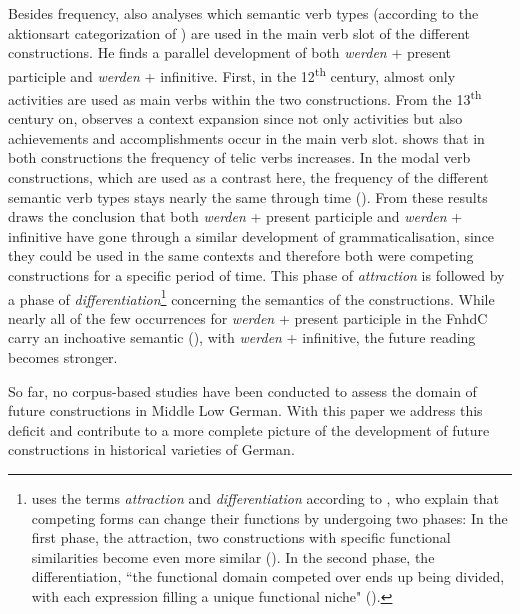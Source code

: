 \documentclass[output=paper,colorlinks,citecolor=brown]{langscibook}
\begin{document}
Besides frequency, \citet{Hartmann2021} also analyses which semantic verb types (according to the aktionsart categorization of \cite{Vendler1957}) are used in the main verb slot of the different constructions. He finds a parallel development of both \textit{werden} + present participle and \textit{werden} + infinitive. First, in the 12\textsuperscript{th} century, almost only activities are used as main verbs within the two constructions. From the 13\textsuperscript{th} century on, \citet[378--379]{Hartmann2021} observes a context expansion since not only activities but also achievements and accomplishments occur in the main verb slot. \citet[379]{Hartmann2021} shows that in both constructions the frequency of telic verbs increases. In the modal verb constructions, which are used as a contrast here, the frequency of the different semantic verb types stays nearly the same through time (\cite[380--381]{Hartmann2021}). From these results \citet[382--383]{Hartmann2021} draws the conclusion that both \textit{werden} + present participle and \textit{werden} + infinitive have gone through a similar development of grammaticalisation, since they could be used in the same contexts and therefore both were competing constructions for a specific period of time. This phase of \textit{attraction} is followed by a phase of \textit{differentiation}\footnote{\citet[389--390]{Hartmann2021} uses the terms \textit{attraction} and \textit{differentiation} according to \citet{DeSmet2018}, who explain that competing forms can change their functions by undergoing two phases: In the first phase, the attraction, two constructions with specific functional similarities become even more similar (\cite[203--204]{DeSmet2018}). In the second phase, the differentiation, ``the functional domain competed over ends up being divided, with each expression filling a unique functional niche" (\cite[198]{DeSmet2018}).} concerning the semantics of the constructions. While nearly all of the few occurrences for \textit{werden} + present participle in the FnhdC carry an inchoative semantic (\cite[390]{Hartmann2021}), with \textit{werden} + infinitive, the future reading becomes stronger.

So far, no corpus-based studies have been conducted to assess the domain of future constructions in Middle Low German. With this paper we address this deficit and contribute to a more complete picture of the development of future constructions in historical varieties of German. 
\end{document}
